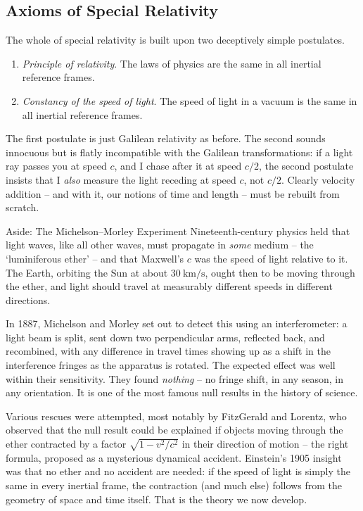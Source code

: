 \subsection{Axioms of Special Relativity}

The whole of special relativity is built upon two deceptively simple postulates.

\begin{axiom}
	\begin{enumerate}
		\item \emph{Principle of relativity}. The laws of physics are the same in all inertial reference frames.
		\item \emph{Constancy of the speed of light}. The speed of light in a vacuum is the same in all inertial reference frames.
	\end{enumerate}
\end{axiom}

The first postulate is just Galilean relativity as before. The second sounds innocuous but is flatly incompatible with the Galilean transformations: if a light ray passes you at speed $c$, and I chase after it at speed $c/2$, the second postulate insists that I \emph{also} measure the light receding at speed $c$, not $c/2$. Clearly velocity addition -- and with it, our notions of time and length -- must be rebuilt from scratch.

\begin{aside}{Aside: The Michelson--Morley Experiment}
	Nineteenth-century physics held that light waves, like all other waves, must propagate in \emph{some} medium -- the `luminiferous ether' -- and that Maxwell's $c$ was the speed of light relative to it. The Earth, orbiting the Sun at about $\SI{30}{\kilo\meter\per\second}$, ought then to be moving through the ether, and light should travel at measurably different speeds in different directions.

	In 1887, Michelson and Morley set out to detect this using an interferometer: a light beam is split, sent down two perpendicular arms, reflected back, and recombined, with any difference in travel times showing up as a shift in the interference fringes as the apparatus is rotated. The expected effect was well within their sensitivity. They found \emph{nothing} -- no fringe shift, in any season, in any orientation. It is one of the most famous null results in the history of science.

	Various rescues were attempted, most notably by FitzGerald and Lorentz, who observed that the null result could be explained if objects moving through the ether contracted by a factor $\sqrt{1 - v^2/c^2}$ in their direction of motion -- the right formula, proposed as a mysterious dynamical accident. Einstein's 1905 insight was that no ether and no accident are needed: if the speed of light is simply the same in every inertial frame, the contraction (and much else) follows from the geometry of space and time itself. That is the theory we now develop.

\end{aside}

